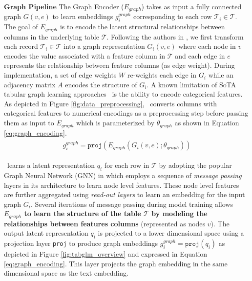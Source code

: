 \noindent \textbf{Graph Pipeline } The Graph Encoder ($E_{graph}$) takes as input a fully connected graph $G(v, e)$ to learn embeddings $g_i^{graph}$ corresponding to each row $\mathcal{T}_i \in \mathcal{T}$. The goal of $E_{graph}$ is to encode the latent structural relationships between columns in the underlying table $\mathcal{T}$.
Following the authors in \citet{ignnet}, we first transform each record $\mathcal{T}_i \in \mathcal{T}$ into a graph representation $G_i(v, e)$ where each node in $v$ encodes the value associated with a feature column in $\mathcal{T}$ and each edge in $e$ represents the relationship between feature columns (as edge weight). 
During implementation, a set of edge weights $W$ re-weights each edge in $G_i$ while an adjacency matrix $A$ encodes the structure of $G_i$.
A known limitation of SoTA tabular graph learning approaches~\cite{ignnet, huang22table2graph} is the ability to encode categorical features. As depicted in Figure \ref{fig:data_preprocessing}, \tabglm\ converts columns with categorical features to numerical encodings as a preprocessing step before passing them as input to $E_{graph}$ which is parameterized by $\theta_{graph}$ as shown in Equation \ref{eq:graph_encoding}.
\begin{align}
\begin{split}
g_i^{graph} = \texttt{proj}( E_{graph}( G_i(v, e); \theta_{graph} ) )    
\end{split}
\label{eq:graph_encoding}
\end{align}

\tabglm\ learns a latent representation $q_i$ for each row in $\mathcal{T}$ by adopting the popular Graph Neural Network (GNN) in \citet{xu2019gnn, ignnet} which employs a sequence of \textit{message passing}~\cite{xu2019gnn} layers in its architecture to learn node level features. These node level features are further aggregated using \textit{read-out layers} to learn an embedding for the input graph $G_i$. 
Several iterations of message passing during model training allows \textbf{$E_{graph}$ to learn the structure of the table $\mathcal{T}$ by modeling the relationships between features columns} (represented as nodes $v$).
The output latent representation $q_i$ is projected to a lower dimensional space using a projection layer \texttt{proj} to produce graph embeddings $g_i^{graph} = \texttt{proj}(q_i)$ as depicted in Figure \ref{fig:tabglm_overview} and expressed in Equation \ref{eq:graph_encoding}. This layer projects the graph embedding in the same dimensional space as the text embedding.

